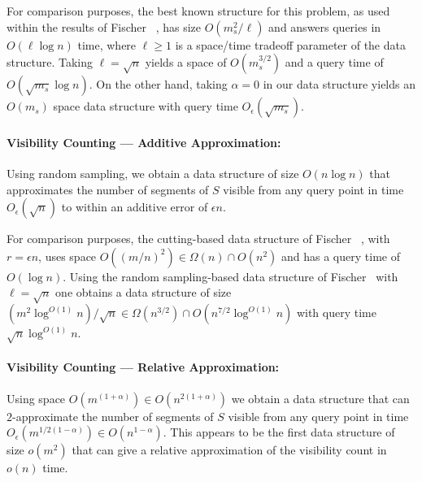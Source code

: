\documentclass{patmorin}
\newcommand{\Oe}{O_\epsilon}
\begin{document}
For comparison purposes, the best known structure for this problem, as used
within the results of Fischer \etal\ \cite{fXX}, has size $O(m_{s}^2/\ell)$
and answers queries in $O(\ell\log n)$ time, where $\ell \ge 1$ is a
space/time tradeoff parameter of the data structure.  Taking
$\ell=\sqrt{n}$ yields a space of $O(m_s^{3/2})$ and a query time of
$O(\sqrt{m_s}\log n)$.  On the other hand, taking $\alpha=0$ in our data
structure yields an $O(m_s)$ space data structure with query time
$\Oe(\sqrt{m_s})$.

\paragraph{Visibility Counting --- Additive Approximation:}
Using random sampling, we obtain a data structure of size $O(n\log n)$
that approximates the number of segments of $S$ visible from any query
point in time $\Oe(\sqrt{n})$ to within an additive error of $\epsilon
n$.

For comparison purposes, the cutting-based data structure of Fischer
\etal\ \cite{fXX}, with $r=\epsilon n$, uses space $O((m/n)^2)\in
\Omega(n)\cap O(n^2)$ and has a query time of $O(\log n)$.  Using
the random sampling-based data structure of Fischer \etal\ with
$\ell=\sqrt{n}$ one obtains a data structure of size $(m^2\log^{O(1)}
n)/\sqrt{n}\in \Omega(n^{3/2})\cap O(n^{7/2}\log^{O(1)} n)$ with query
time $\sqrt{n}\log^{O(1)} n$.

\paragraph{Visibility Counting --- Relative Approximation:} 

Using space $O(m^{(1+\alpha)})\in O(n^{2(1+\alpha)})$ we obtain a data
structure that can $2$-approximate the number of segments of $S$ visible
from any query point in time $\Oe(m^{1/2(1-\alpha)})\in O(n^{1-\alpha})$.
This appears to be the first data structure of size $o(m^2)$ that can give
a relative approximation of the visibility count in $o(n)$ time.

\end{document}
